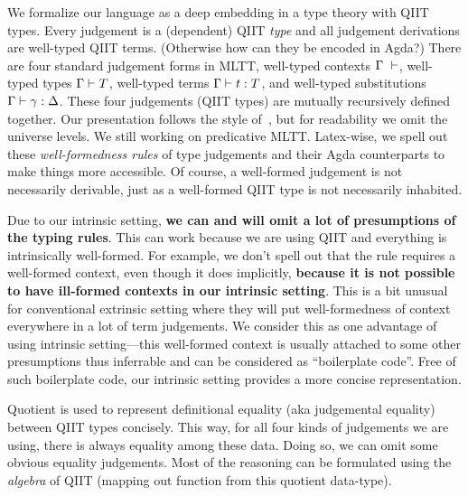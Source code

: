 

We formalize our language as a deep embedding in a type theory with QIIT types. Every judgement is a (dependent) QIIT \textit{type} and all judgement derivations are well-typed QIIT terms. (Otherwise how can they be encoded in Agda?) There are four standard judgement forms in MLTT,
well-typed contexts $\goodCtx{\Gamma}{l}$, well-typed types
$\goodType{\Gamma}{T}{l}$, well-typed terms $\goodTerm{\Gamma}{t}{T}$, and
well-typed substitutions $\goodSub{\Gamma}{\gamma}{\Delta}$. These four judgements (QIIT types) are
mutually recursively defined together. Our presentation
follows the style of~\citet{kaposi2019gluing}, but for readability we
omit the universe levels. We still working on predicative MLTT.
Latex-wise, we spell out these \textit{well-formedness rules} of type
judgements and their Agda counterparts to make things more accessible. Of
course, a well-formed judgement is not necessarily derivable, just as
a well-formed QIIT type is not necessarily inhabited. 


Due to our intrinsic setting, \textbf{we can and will omit a lot of
presumptions of the typing rules}. This can work because we are using
QIIT and everything is intrinsically well-formed. For example, we don't
spell out that the rule  requires a well-formed
context, even though it does implicitly, \textbf{because it is not
possible to have ill-formed contexts in our intrinsic setting}. This is
a bit unusual for conventional extrinsic setting where they will put
well-formedness of context everywhere in a lot of term judgements. We
consider this as one advantage of using intrinsic setting---this
well-formed context is usually attached to some other presumptions thus
inferrable and can be considered as ``boilerplate code''. Free of
such boilerplate code, our intrinsic setting provides a more concise
representation.

Quotient is used to represent definitional equality (aka judgemental
equality) between QIIT types concisely.
This way, for all four kinds of judgements we are
using, there is always equality among these data. Doing so, we can omit
some obvious equality judgements. Most of the reasoning can be formulated
using the \textit{algebra} of QIIT (mapping out function from this
quotient data-type). 

